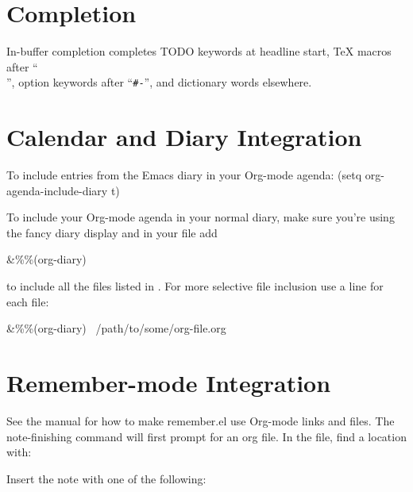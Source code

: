 
\section{Completion}

In-buffer completion completes TODO keywords at headline start, TeX
macros after ``{\tt \\}'', option keywords after ``{\tt \#-}'', and
dictionary words elsewhere.


\newcolumn

\section{Calendar and Diary Integration}

To include entries from the Emacs diary in your Org-mode agenda:
\beginexample%
(setq org-agenda-include-diary t)
\endexample

To include your Org-mode agenda in your normal diary, make sure you're
using the fancy diary display
%
%
and in your  file add

\beginexample%
\&\%\%(org-diary)
\endexample

to include all the files listed in .  For more
selective file inclusion use a line for each file:

\beginexample%
\&\%\%(org-diary) ~/path/to/some/org-file.org
\endexample

\section{Remember-mode Integration}

See the manual for how to make remember.el use Org-mode links and
files.  The note-finishing command  will first prompt for
an org file. In the file, find a location with:


Insert the note with one of the following: 


